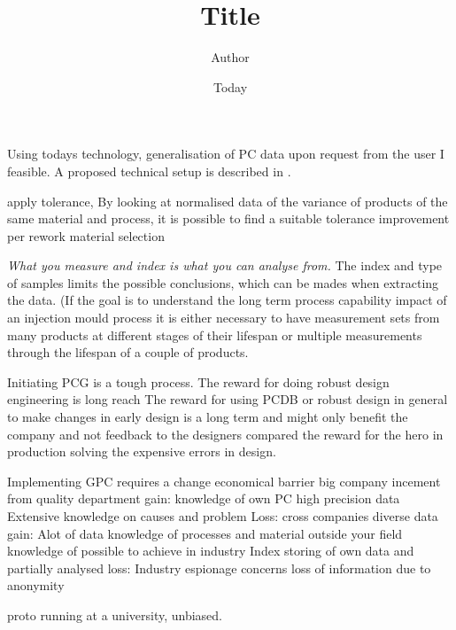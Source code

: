 \documentclass[]{article}
\begin{document}
\title{Title}
\author{Author}
\date{Today}
\maketitle

Using todays technology, generalisation of PC data upon request from the user I feasible. A proposed technical setup is described in \cite{OkholmRask******* Techpaper}.

apply tolerance, By looking at normalised data of the variance of products of the same material and process, it is possible to find a suitable tolerance
improvement per rework
material selection

\emph{What you measure and index is what you can analyse from.}
The index and type of samples limits the possible conclusions, which can be mades when extracting the data.  (If the goal is to understand the long term process capability impact of an injection mould process it is either necessary to have measurement sets from many products at different stages of their lifespan or multiple measurements through the lifespan of a couple of products.   

Initiating PCG is a tough process. 
The reward for doing robust design engineering is long reach
The reward for using PCDB or robust design in general to make changes in early design is a long term and might only benefit the company and not feedback to the designers compared the reward for the hero in production solving the expensive errors in design.

Implementing GPC requires a change
	economical barrier
		big company
			incement from quality department
			gain: 	knowledge of own PC
					high precision data
					Extensive knowledge on causes and problem
			Loss:
		cross companies
			diverse data
			gain:		Alot of data
					knowledge of processes and material outside your field
					knowledge of possible to achieve in industry
					Index storing of own data and partially analysed
			loss:		Industry espionage concerns
					loss of information due to anonymity

proto running at a university, unbiased.
\end{document}

